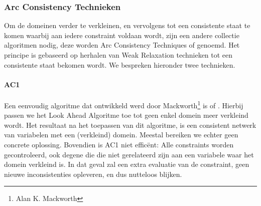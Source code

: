 \subsubsection{Arc Consistency Technieken}
Om de domeinen verder te verkleinen, en vervolgens tot een consistente staat te komen waarbij aan iedere constraint voldaan wordt, zijn een andere collectie algoritmen nodig, deze worden Arc Consistency Techniques of  genoemd. Het principe is gebaseerd op herhalen van Weak Relaxation technieken tot een consistente staat bekomen wordt. We bespreken hieronder twee technieken.
\paragraph{AC1} Een eenvoudig algoritme dat ontwikkeld werd door Mackworth\footnote{Alan K. Mackworth} is  of . Hierbij passen we het Look Ahead Algoritme toe tot geen enkel domein meer verkleind wordt. Het resultaat na het toepassen van dit algoritme, is een consistent netwerk van variabelen met een (verkleind) domein. Meestal bereiken we echter geen concrete oplossing. Bovendien is AC1 niet effic\"ent: Alle constraints worden gecontroleerd, ook degene die die niet gerelateerd zijn aan een variabele waar het domein verkleind is. In dat geval zal een extra evaluatie van de constraint, geen nieuwe inconsistenties opleveren, en dus nutteloos blijken.
